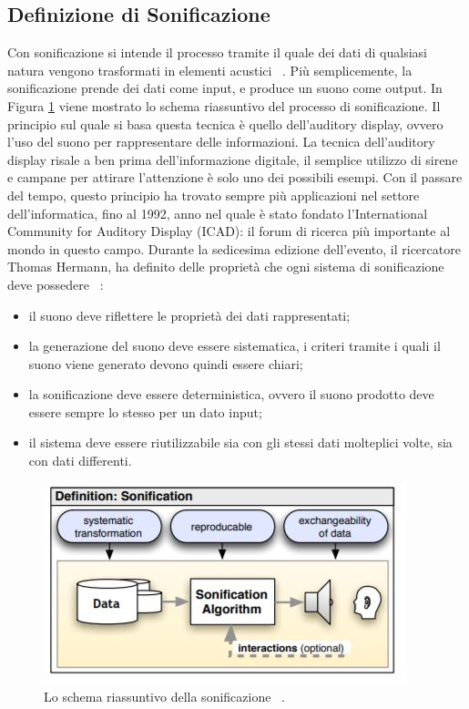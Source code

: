 \subsection{Definizione di Sonificazione}
Con sonificazione si intende il processo tramite il quale dei dati di qualsiasi natura vengono trasformati in elementi acustici ~\cite{hermann}.
Più semplicemente, la sonificazione prende dei dati come input, e produce un suono come output. In Figura \ref{fig:sonification_scheme} viene mostrato lo schema riassuntivo del processo di sonificazione.
Il principio sul quale si basa questa tecnica è quello dell'auditory display, ovvero l'uso del suono per rappresentare delle informazioni.
La tecnica dell'auditory display risale a ben prima dell'informazione digitale, il semplice utilizzo di sirene e campane per attirare l'attenzione è solo uno dei possibili esempi.
Con il passare del tempo, questo principio ha trovato sempre più applicazioni nel settore dell'informatica, fino al 1992, anno nel quale è stato fondato l'International Community for Auditory Display (ICAD): il forum di ricerca più importante al mondo in questo campo.
Durante la sedicesima edizione dell'evento, il ricercatore Thomas Hermann, ha definito delle proprietà che ogni sistema di sonificazione deve possedere ~\cite{hermann}:
\begin{itemize}
  \item{il suono deve riflettere le proprietà dei dati rappresentati;}
  \item{la generazione del suono deve essere sistematica, i criteri tramite i quali il suono viene generato devono quindi essere chiari;}
  \item{la sonificazione deve essere deterministica, ovvero il suono prodotto deve essere sempre lo stesso per un dato input;}
  \item{il sistema deve essere riutilizzabile sia con gli stessi dati molteplici volte, sia con dati differenti.}
\end{itemize}
\begin{figure}[H]
  \includegraphics[width=\linewidth,scale=0.5]{img/schema.png}
  \caption{Lo schema riassuntivo della sonificazione ~\cite{hermann}.}
  \label{fig:sonification_scheme}
\end{figure}



